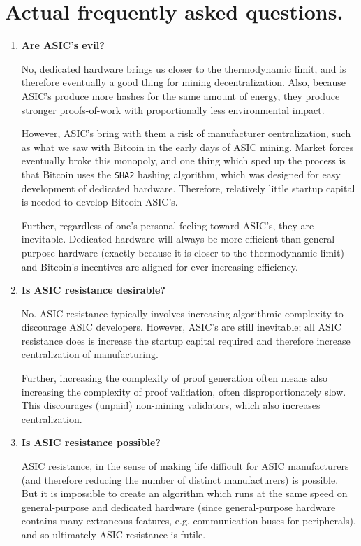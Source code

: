 \documentclass[letterpaper]{article}
\theoremstyle{xxx}
\theoremstyle{evil}
\theoremstyle{yyy}
\theoremstyle{plain}
\theoremstyle{zzz}
\begin{document}
\section{Actual frequently asked questions.}

\begin{enumerate}
\item \textbf{Are ASIC's evil?}

No, dedicated hardware brings us closer to the thermodynamic limit,
and is therefore eventually a good thing for mining decentralization.
Also, because ASIC's produce more hashes for the same amount of
energy, they produce stronger proofs-of-work with proportionally less
environmental impact.

However, ASIC's bring with them a risk of manufacturer centralization,
such as what we saw with Bitcoin in the early days of ASIC mining.
Market forces eventually broke this monopoly, and one thing which sped
up the process is that Bitcoin uses the \texttt{SHA2} hashing algorithm,
which was designed for easy development of dedicated hardware. Therefore,
relatively little startup capital is needed to develop Bitcoin ASIC's.

Further, regardless of one's personal feeling toward ASIC's, they
are inevitable. Dedicated hardware will always be more efficient
than general-purpose hardware (exactly because it is closer to the
thermodynamic limit) and Bitcoin's incentives are aligned for
ever-increasing efficiency.

\item \textbf{Is ASIC resistance desirable?}

No. ASIC resistance typically involves increasing algorithmic
complexity to discourage ASIC developers. However, ASIC's are
still inevitable; all ASIC resistance does is increase the
startup capital required and therefore increase centralization
of manufacturing.

Further, increasing the complexity of proof generation often means
also increasing the complexity of proof validation, often
disproportionately slow. This discourages (unpaid) non-mining
validators, which also increases centralization.

\item \textbf{Is ASIC resistance possible?}

ASIC resistance, in the sense of making life difficult for ASIC
manufacturers (and therefore reducing the number of distinct
manufacturers) is possible. But it is impossible to create
an algorithm which runs at the same speed on general-purpose and
dedicated hardware (since general-purpose hardware contains many
extraneous features, e.g. communication buses for peripherals),
and  so ultimately ASIC resistance is futile.


\end{enumerate}
\end{document}
